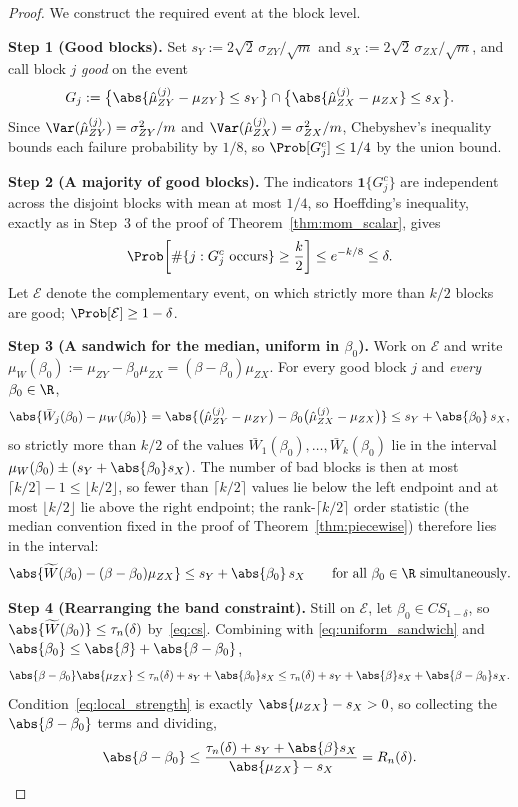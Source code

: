 \begin{proof}
We construct the required event at the block level.

\medskip\noindent\textbf{Step 1 (Good blocks).} Set $s_Y := 2\sqrt{2}\,\sigma_{ZY}/\sqrt{m}$ and $s_X := 2\sqrt{2}\,\sigma_{ZX}/\sqrt{m}$, and call block $j$ \emph{good} on the event
\[
  G_j := \bigl\{\abs{\hat{\mu}_{ZY}^{(j)} - \mu_{ZY}} \le s_Y\bigr\} \cap \bigl\{\abs{\hat{\mu}_{ZX}^{(j)} - \mu_{ZX}} \le s_X\bigr\}.
\]
Since $\Var(\hat{\mu}_{ZY}^{(j)}) = \sigma_{ZY}^2/m$ and $\Var(\hat{\mu}_{ZX}^{(j)}) = \sigma_{ZX}^2/m$, Chebyshev's inequality bounds each failure probability by $1/8$, so $\Prob[G_j^c] \le 1/4$ by the union bound.

\medskip\noindent\textbf{Step 2 (A majority of good blocks).} The indicators $\mathbf{1}\{G_j^c\}$ are independent across the disjoint blocks with mean at most $1/4$, so Hoeffding's inequality, exactly as in Step~3 of the proof of Theorem~\ref{thm:mom_scalar}, gives
\[
  \Prob\!\left[\#\{j : G_j^c \text{ occurs}\} \ge \frac{k}{2}\right] \le e^{-k/8} \le \delta.
\]
Let $\mathcal{E}$ denote the complementary event, on which strictly more than $k/2$ blocks are good; $\Prob[\mathcal{E}] \ge 1-\delta$.

\medskip\noindent\textbf{Step 3 (A sandwich for the median, uniform in $\beta_0$).} Work on $\mathcal{E}$ and write $\mu_W(\beta_0) := \mu_{ZY} - \beta_0\mu_{ZX} = (\beta - \beta_0)\mu_{ZX}$. For every good block $j$ and \emph{every} $\beta_0 \in \R$,
\[
  \abs{\bar{W}_j(\beta_0) - \mu_W(\beta_0)}
  = \abs{\bigl(\hat{\mu}_{ZY}^{(j)} - \mu_{ZY}\bigr) - \beta_0\bigl(\hat{\mu}_{ZX}^{(j)} - \mu_{ZX}\bigr)}
  \le s_Y + \abs{\beta_0}\,s_X,
\]
so strictly more than $k/2$ of the values $\bar{W}_1(\beta_0),\dots,\bar{W}_k(\beta_0)$ lie in the interval $\mu_W(\beta_0) \pm (s_Y + \abs{\beta_0}s_X)$. The number of bad blocks is then at most $\lceil k/2\rceil - 1 \le \lfloor k/2\rfloor$, so fewer than $\lceil k/2\rceil$ values lie below the left endpoint and at most $\lfloor k/2 \rfloor$ lie above the right endpoint; the rank-$\lceil k/2\rceil$ order statistic (the median convention fixed in the proof of Theorem~\ref{thm:piecewise}) therefore lies in the interval:
\begin{equation}
  \abs{\widetilde{W}(\beta_0) - (\beta - \beta_0)\mu_{ZX}} \le s_Y + \abs{\beta_0}\,s_X
  \qquad \text{for all } \beta_0 \in \R \text{ simultaneously}.
  \label{eq:uniform_sandwich}
\end{equation}

\medskip\noindent\textbf{Step 4 (Rearranging the band constraint).} Still on $\mathcal{E}$, let $\beta_0 \in CS_{1-\delta}$, so $\abs{\widetilde{W}(\beta_0)} \le \tau_n(\delta)$ by~\eqref{eq:cs}. Combining with \eqref{eq:uniform_sandwich} and $\abs{\beta_0} \le \abs{\beta} + \abs{\beta - \beta_0}$,
\[
  \abs{\beta - \beta_0}\abs{\mu_{ZX}}
  \le \tau_n(\delta) + s_Y + \abs{\beta_0}s_X
  \le \tau_n(\delta) + s_Y + \abs{\beta}s_X + \abs{\beta - \beta_0}s_X.
\]
Condition~\eqref{eq:local_strength} is exactly $\abs{\mu_{ZX}} - s_X > 0$, so collecting the $\abs{\beta-\beta_0}$ terms and dividing,
\[
  \abs{\beta - \beta_0} \le \frac{\tau_n(\delta) + s_Y + \abs{\beta}s_X}{\abs{\mu_{ZX}} - s_X} = R_n(\delta). \qedhere
\]
\end{proof}

